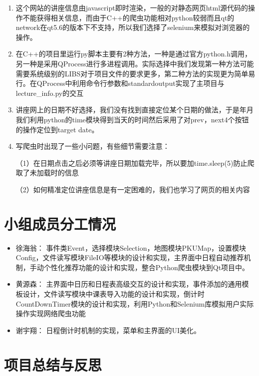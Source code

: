 \documentclass[11pt,hyperref,a4paper,UTF8]{ctexart}
\begin{document}
\begin{CJK}{UTF8}{gkai}
\begin{enumerate}
    \item 这个网站的讲座信息由javascript即时渲染，一般的对静态网页html源代码的操作不能获得相关信息，而由于C++的爬虫功能相对python较弱而且qt的network在qt5.6的版本下不支持，所以我们选择了selenium来模拟对浏览器的操作。
    \item 在C++的项目里运行py脚本主要有2种方法，一种是通过官方python.h调用，另一种是采用QProcess进行多进程调用。实际选择中我们发现第一种方法可能需要系统级别的LIBS对于项目文件的要求更多，第二种方法的实现更为简单易行。在QProcess中利用命令行参数和standardoutput实现了主项目与lecture\_info.py的交互
    \item 讲座网上的日期不好选择，我们没有找到直接定位某个日期的做法，于是年月我们利用python的time模块得到当天的时间然后采用了对prev，next4个按钮的操作定位到target date。
    \item 写爬虫时出现了一些小问题，有些细节需要注意：

    （1）在日期点击之后必须等讲座日期加载完毕，所以要加time.sleep(5)防止爬取了未加载时的信息

    （2）如何精准定位讲座信息是有一定困难的，我们也学习了网页的相关内容
\end{enumerate}

\section{小组成员分工情况}
\begin{itemize}
    \item 徐海翁： 事件类Event，选择模块Selection，地图模块PKUMap，设置模块Config，文件读写模块FileIO等模块的设计和实现，主界面中日程自动推荐机制，手动个性化推荐功能的设计和实现，整合Python爬虫模块到Qt项目中。
    \item 黄源森： 主界面中日历和日程表高级交互的设计和实现，事件添加的通用模板设计，文件读写模块中课表导入功能的设计和实现，倒计时CountDownTimer模块的设计和实现，利用Python和Selenium库模拟用户实际操作实现网络爬虫功能
    \item 谢宇翔： 日程倒计时机制的实现，菜单和主界面的UI美化。
\end{itemize}

\section{项目总结与反思}


\end{CJK}
\end{document}
